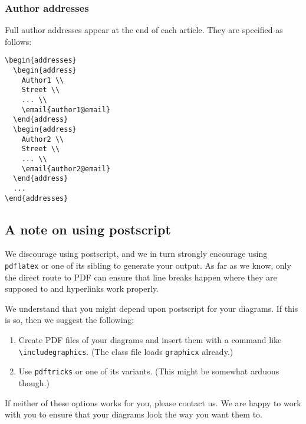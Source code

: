 \documentclass[lucida,final]{sp}
\newcommand{\spfile}[1]{\texttt{#1}}
\newcommand{\cmd}[1]{\texttt{\textbackslash#1}}
\begin{document}
\subsubsection{Author addresses}

Full author addresses appear at the end of each article.  They are
specified as follows:
%
\begin{Verbatim}
\begin{addresses}
  \begin{address}
    Author1 \\
    Street \\
    ... \\
    \email{author1@email}
  \end{address}
  \begin{address}
    Author2 \\
    Street \\
    ... \\
    \email{author2@email}
  \end{address}
  ...
\end{addresses}
\end{Verbatim}



\subsection{A note on using postscript}\label{sec:ps}

We discourage using postscript, and we in turn strongly encourage
using \spfile{pdflatex} or one of its sibling to generate your output.
As far as we know, only the direct route to PDF can ensure that line
breaks happen where they are supposed to and hyperlinks work properly.

We understand that you might depend upon postscript for your diagrams.
If this is so, then we suggest the following:
%
\begin{enumerate}
\item Create PDF files of your diagrams and insert them with a command
  like \cmd{includegraphics}. (The class file loads \spfile{graphicx}
  already.)
\item Use \spfile{pdftricks} or one of its variants.  (This might be
  somewhat arduous though.)
\end{enumerate}
%
If neither of these options works for you, please contact us.  We are
happy to work with you to ensure that your diagrams look the way you
want them to.
\end{document}
